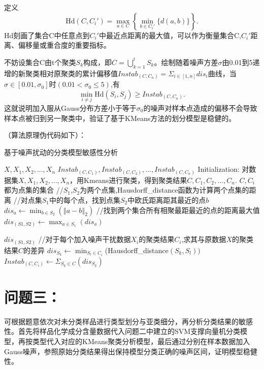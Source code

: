 \documentclass[withoutpreface,bwprint]{cumcmthesis}
\newcommand{\norm}[1]{\left\Vert#1\right\Vert}
\newcommand{\mr}[1]{\mathrm{#1}}
\begin{document}
定义
\begin{equation}
	\mr{Hd}(C,C_i')=\max_{a\in C}\left\{\min_{b\in C_i'}\{d(a,b)\}\right\}.
\end{equation}
Hd刻画了集合C中任意点到$C_i'$中最近点距离的最大值，可以作为衡量集合C,$C_i'$距离、偏移量或重合度的重要指标\cite{Huang2019}。

不妨设集合C由t个聚类$S_k$构成，即$C=\bigcup_{k=1}^tS_k$。绘制随着噪声方差$\sigma$由0.01到5递增的新聚类相对原聚类的累计偏移值$Instab_{(C,C_n)}=\Sigma_{i\in [1,n]}dis_i$曲线，当$\sigma\in[0.01,\sigma_0]$时$(0.01<\sigma_0\leqslant 5)$,有
\begin{equation}
	\min_{i\neq j}\mr{Hd}(S_i,S_j)\geqslant Instab_{(C,C_n)}.
\end{equation}
这就说明加入服从Gauss分布方差小于等于$\sigma_0$的噪声对样本点造成的偏移不会导致样本点被归到另一聚类中，验证了基于KMeans方法的划分模型是稳健的。

（算法原理伪代码如下）：

\begin{algorithm}[H]
\caption{基于噪声扰动的分类模型敏感性分析}
\label{基于噪声扰动的分类模型敏感性分析}
\begin{algorithmic}[1]
	\Require $X,X_1,X_2,...,X_n$
	\Ensure	$Instab_{(C,C_1)},Instab_{(C,C_2)},...,Instab_{(C,C_n)}$
	\State Initialization: 对数据集$X,X_1,X_2,...,X_n$，用Kmeans进行聚类，得到聚类结果$C,C_1,C_2,...,C_n$. $C,C_i$都为点集的集合
	\Statex \quad //$S_1$,$S_2$为两个点集,Hausdorff\_distance函数为计算两个点集的距离
	\Statex \qquad//对点集$S_1$中的每个点，找到点集$S_2$中欧氏距离距其最近的点$b$
	\State $dis_a \leftarrow \min_{b\in S_2}(\norm{a-b}_2)$
	\EndFor
	\qquad //找到两个集合所有相聚最距最近的点的距离最大值
	\State $dis_{(S1,S2)}\leftarrow \max_{a\in S_1}(dis_a)$
	
	\Return $dis_{(S1,S2)}$
	\EndFunction
	\Statex \quad //对于每个加入噪声干扰数据$X_i$的聚类结果$C_i$,求其与原数据$X$的聚类结果$C$的差异
	 \State $dis_{S_k} \leftarrow \min_{S_l\in C_i}$(Hausdorff\_distance$ (S_k,S_l))$
	 \EndFor
	 \State $Instab_{(C,C_i)}\leftarrow \Sigma_{S_k\in C}(dis_{S_k})$
	\EndFor
\end{algorithmic}
\end{algorithm}

\section{问题三：}
可根据题意依次对未分类样品进行类型划分与亚类细分，再分析分类结果的敏感性。首先将样品化学成分含量数据代入问题二中建立的SVM支撑向量机分类模型，再按类型代入对应的KMeans聚类分析模型，最后通过分别在样本数据加入Gauss噪声，参照原始分类结果得出保持模型分类正确的噪声区间，证明模型稳健性。
\end{document}
